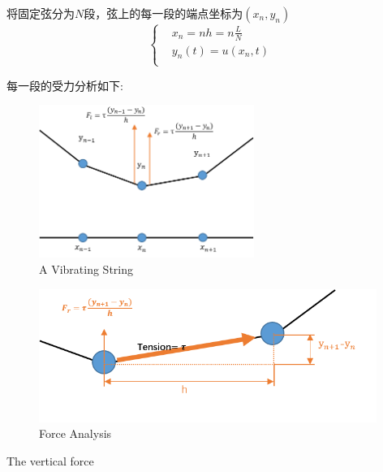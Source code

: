 \documentclass[UTF8,10pt,a4paper]{ctexart}
\begin{document}
		将固定弦分为$N$段，弦上的每一段的端点坐标为$(x_n,y_n)$	
		\begin{equation}
		    \left\{
			\begin{aligned}
				&x_n =nh=n\frac{L}{N} \\
				&y_n(t) =u(x_n,t) \\
			\end{aligned}
			\right.
		\end{equation}
  		
		每一段的受力分析如下:	
		\begin{figure}[ht]
			\centering
			\includegraphics[width=7cm]{vibratingStringF.png}
			\caption{A Vibrating String}
			\label{fig:vibStrF}
		\end{figure}
		
		\begin{figure}[ht]
			\centering
			\includegraphics[width=11cm]{tension.png}
			\caption{Force Analysis}
			\label{fig:tens}
		\end{figure}	
		The vertical force
\end{document}
